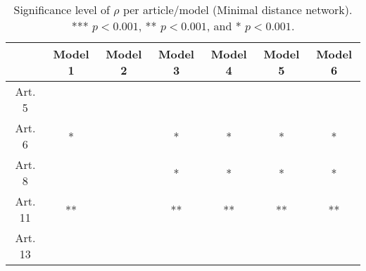 \begin{table}[ht]
\centering
\begin{tabular}{ccccccc}
  \toprule
 & Model 1 & Model 2 & Model 3 & Model 4 & Model 5 & Model 6 \\ 
  \midrule
Art. 5 &   &   &   &   &   &   \\ 
   \midrule
Art. 6 & * &   & * & * & * & * \\ 
   \midrule
Art. 8 &   &   & * & * & * & * \\ 
   \midrule
Art. 11 & ** &   & ** & ** & ** & ** \\ 
   \midrule
Art. 13 &   &   &   &   &   &   \\ 
   \bottomrule
\end{tabular}
\caption{Significance level of $\rho$ per article/model (Minimal distance network). *** $p < 0.001$, ** $p < 0.001$, and * $p < 0.001$.} 
\end{table}
